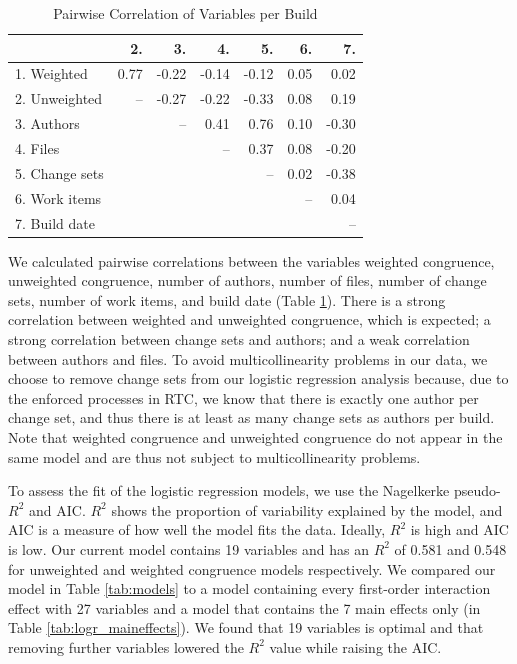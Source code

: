\begin{table}[t]
\begin{center}
\begin{tabular}{l|rrrrrr}
 & 2. & 3. & 4. & 5. & 6. & 7. \\ 
  \hline
   1. Weighted & 0.77 & -0.22 & -0.14 & -0.12 & 0.05 & 0.02 \\ 
   2. Unweighted  &-- & -0.27 & -0.22 & -0.33 & 0.08 & 0.19 \\ 
   3. Authors &  & --& 0.41 & 0.76 & 0.10 & -0.30 \\ 
   4. Files &  &  & --& 0.37 & 0.08 & -0.20 \\ 
   5. Change sets &  &  &  &  --& 0.02 & -0.38 \\ 
   6. Work items  &  &  &  &  &  --& 0.04 \\ 
   7. Build date &  &  &  &  &  & -- \\ 
\hline

\end{tabular}
\end{center}
\caption{Pairwise Correlation of Variables per Build}
\label{tab:pairwise}
\end{table}

We calculated pairwise correlations between the variables weighted congruence, unweighted congruence, number of authors, number of files, number of change sets, number of work items, and build date (Table \ref{tab:pairwise}). There is a strong correlation between weighted and unweighted congruence, which is expected; a strong correlation between change sets and authors; and a weak correlation between authors and files. To avoid multicollinearity problems in our data, we choose to remove change sets from our logistic regression analysis because, due to the enforced processes in RTC, we know that there is exactly one author per change set, and thus there is at least as many change sets as authors per build. Note that weighted congruence and unweighted congruence do not appear in the same model and are thus not subject to multicollinearity problems.

To assess the fit of the logistic regression models, we use the Nagelkerke pseudo-$R^2$ and AIC. $R^2$ shows the proportion of variability explained by the model, and AIC is a measure of how well the model fits the data. Ideally, $R^2$ is high and AIC is low. Our current model contains 19 variables and has an $R^2$ of 0.581 and 0.548 for unweighted and weighted congruence models respectively. We compared our model in Table \ref{tab:models} to a model containing every first-order interaction effect with 27 variables and a model that contains the 7 main effects only (in Table \ref{tab:logr_maineffects}). We found that 19 variables is optimal and that removing further variables lowered the $R^2$ value while raising the AIC.

